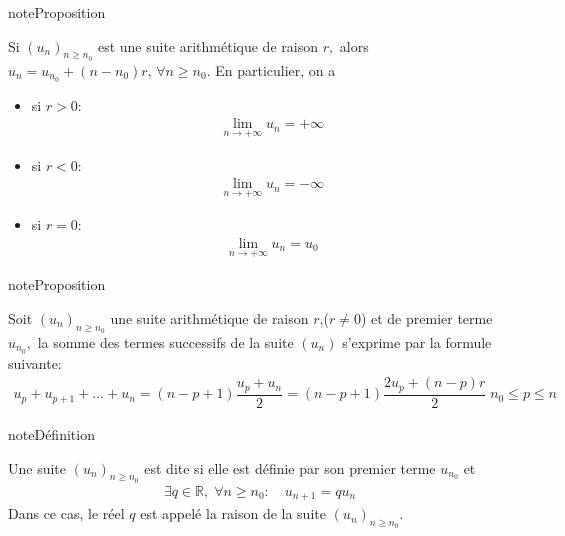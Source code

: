 \documentclass[letterpaper,10pt,french]{jupyterBook}
\begin{document}
\begin{sphinxadmonition}{note}{Proposition}

\sphinxAtStartPar
Si \((u_n)_{n\geq n_0}\) est une suite arithmétique de raison \(r,\) alors \(u_n=u_{n_0}+(n-n_0)r,\, \forall n\geq n_0.\) En particulier, on a
\begin{itemize}
\item {} 
\sphinxAtStartPar
si \(r>0\):
\begin{equation*}
\begin{split}
    \lim_{n \rightarrow +\infty}u_n=+\infty
    \end{split}
\end{equation*}
\item {} 
\sphinxAtStartPar
si \(r<0\):
\begin{equation*}
\begin{split}
    \lim_{n \rightarrow +\infty}u_n=-\infty
    \end{split}
\end{equation*}
\item {} 
\sphinxAtStartPar
si \(r=0\):
\begin{equation*}
\begin{split}
    \lim_{n \rightarrow +\infty}u_n=u_0
    \end{split}
\end{equation*}
\end{itemize}
\end{sphinxadmonition}

\begin{sphinxadmonition}{note}{Proposition}

\sphinxAtStartPar
Soit \((u_n)_{n\geq n_0}\) une suite arithmétique de raison \(r\),(\(r\neq0\)) et de premier terme \(u_{n_0},\) la somme des termes successifs de la suite \((u_n)\) s’exprime par la formule suivante:
\begin{equation*}
\begin{split}
u_p+u_{p+1}+...+u_n=(n-p+1)\dfrac{u_p+u_n}{2}=(n-p+1)\dfrac{2u_p+(n-p)r}{2}\;n_0\leq p\leq n
\end{split}
\end{equation*}\end{sphinxadmonition}

\sphinxAtStartPar
{}

\begin{sphinxadmonition}{note}{Définition}

\sphinxAtStartPar
Une suite \((u_n)_{n\geq n_0}\) est dite  si elle est définie par son premier terme \(u_{n_0}\) et
\begin{equation*}
\begin{split}
\exists q\in \mathbb{R},\;\forall n\geq n_0:\quad u_{n+1}=qu_n
\end{split}
\end{equation*}
\sphinxAtStartPar
Dans ce cas, le réel \(q\) est appelé la raison de la suite \((u_n)_{n\geq n_0}.\)
\end{sphinxadmonition}
\end{document}
